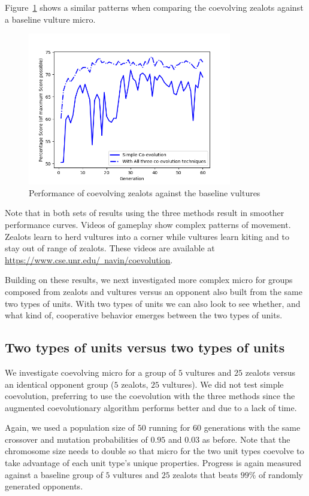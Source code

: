 \documentclass[conference,10pt]{IEEEtran}
\begin{document}
Figure~\ref{CoZealotsVsVultures} shows a similar patterns when
comparing the coevolving zealots against a baseline vulture micro.
\begin{figure}
    \centerline{
      \includegraphics[width=3.5in]{Bonetype.png}
      }
    \caption{Performance of coevolving zealots against the baseline vultures}
    \label{CoZealotsVsVultures}
\end{figure}
Note that in both sets of results using the three methods result in
smoother performance curves. Videos of gameplay show complex patterns
of movement. Zealots learn to herd vultures into a corner while
vultures learn kiting and to stay out of range of zealots. These
videos are available at
\href{https://www.cse.unr.edu/~navin/coevolution}{https://www.cse.unr.edu/~navin/coevolution}.

Building on these results, we next investigated more complex micro for
groups composed from zealots and vultures versus an opponent also
built from the same two types of units. With two types of units we can
also look to see whether, and what kind of, cooperative behavior
emerges between the two types of units.

\subsection{Two types of units versus two types of units}

We investigate coevolving micro for a group of $5$ vultures and $25$
zealots versus an identical opponent group ($5$ zealots, $25$
vultures). We did not test simple coevolution, preferring to use the
coevolution with the three methods since the augmented coevolutionary
algorithm performs better and due to a lack of time.

Again, we used a population size of $50$ running for $60$ generations
with the same crossover and mutation probabilities of $0.95$ and
$0.03$ as before. Note that the chromosome size needs to double so
that micro for the two unit types coevolve to take advantage of each
unit type's unique properties. Progress is again measured against a
baseline group of $5$ vultures and $25$ zealots that beats $99\%$ of
randomly generated opponents.
\end{document}
